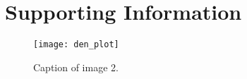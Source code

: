 \chapter{Supporting Information}\label{app:app1}

\begin{figure}[h]
	\centering
	\texttt{[image: den\_plot]}
	\caption{Caption of image 2.}
	\label{fig: img2}
\end{figure}